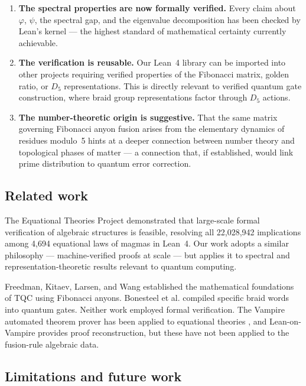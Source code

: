 \documentclass[11pt,a4paper]{article}
\begin{document}
\begin{enumerate}
  \item \textbf{The spectral properties are now formally verified.}
  Every claim about $\varphi$, $\psi$, the spectral gap, and the eigenvalue
  decomposition has been checked by Lean's kernel --- the highest standard
  of mathematical certainty currently achievable.

  \item \textbf{The verification is reusable.}
  Our Lean~4 library can be imported into other projects requiring verified
  properties of the Fibonacci matrix, golden ratio, or $D_5$ representations.
  This is directly relevant to verified quantum gate construction, where
  braid group representations factor through $D_5$ actions.

  \item \textbf{The number-theoretic origin is suggestive.}
  That the same matrix governing Fibonacci anyon fusion arises from the
  elementary dynamics of residues modulo~5 hints at a deeper connection
  between number theory and topological phases of matter --- a connection
  that, if established, would link prime distribution to quantum error
  correction.
\end{enumerate}

\subsection{Related work}

The Equational Theories Project \cite{tao2024etp} demonstrated that large-scale
formal verification of algebraic structures is feasible, resolving all
22,028,942 implications among 4,694 equational laws of magmas in Lean~4.
Our work adopts a similar philosophy --- machine-verified proofs at scale ---
but applies it to spectral and representation-theoretic results relevant to
quantum computing.

Freedman, Kitaev, Larsen, and Wang \cite{freedman2003} established the
mathematical foundations of TQC using Fibonacci anyons. Bonesteel et al.
\cite{bonesteel2005} compiled specific braid words into quantum gates.
Neither work employed formal verification. The Vampire automated theorem
prover has been applied to equational theories \cite{vampire2025}, and
Lean-on-Vampire \cite{lean_vampire2026} provides proof reconstruction,
but these have not been applied to the fusion-rule algebraic data.

\subsection{Limitations and future work}
\end{document}
